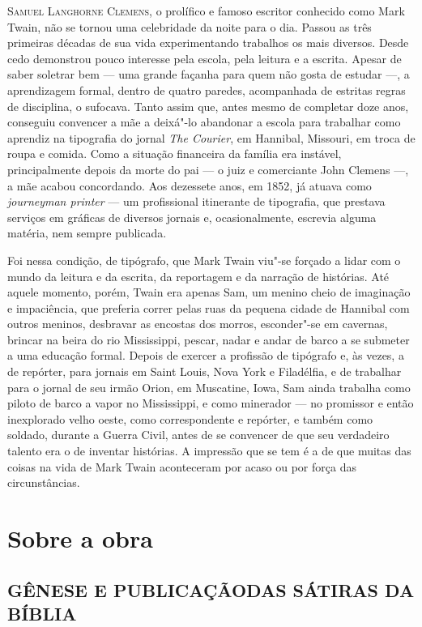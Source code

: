 \noindent\textsc{Samuel Langhorne Clemens,} o prolífico e famoso escritor conhecido como Mark
Twain, não se tornou uma celebridade da noite para o dia. Passou as três
primeiras décadas de sua vida experimentando trabalhos os mais diversos.
Desde cedo demonstrou pouco interesse pela escola,
pela leitura e a escrita. Apesar de saber soletrar bem --- uma grande
façanha para quem não gosta de estudar ---, a aprendizagem formal, dentro de
quatro paredes, acompanhada de estritas regras de disciplina, o sufocava. Tanto assim que, antes mesmo de
completar doze anos, conseguiu convencer a mãe a deixá"-lo abandonar 
a escola para trabalhar como aprendiz na tipografia do jornal \textit{The Courier},
em Hannibal, Missouri, em troca de roupa e comida. Como a situação
financeira da família era instável, principalmente depois da morte do pai
--- o juiz e comerciante John Clemens ---, a mãe acabou concordando. Aos dezessete
anos, em 1852, já atuava como \textit{journeyman printer} --- um
profissional itinerante de tipografia, que prestava serviços em gráficas
de diversos jornais e, ocasionalmente, escrevia alguma matéria, nem
sempre publicada.

Foi nessa condição, de tipógrafo, que Mark Twain
viu"-se forçado a lidar com o mundo da leitura e da escrita, da reportagem
e da narração de histórias. Até aquele momento, porém, Twain era
apenas Sam, um menino cheio de imaginação e impaciência, que preferia
correr pelas ruas da pequena cidade de Hannibal com outros meninos,
desbravar as encostas dos morros, esconder"-se em cavernas, brincar na
beira do rio Mississippi, pescar, nadar e andar de barco a se submeter a
uma educação formal. Depois de exercer a profissão de tipógrafo e, às
vezes, a de repórter, para jornais em Saint Louis, Nova York e
Filadélfia, e de trabalhar para o jornal de seu irmão Orion, em
Muscatine, Iowa, Sam ainda trabalha como piloto de barco a vapor no
Mississippi, e como minerador --- no promissor e então inexplorado velho oeste,
como correspondente e repórter, e também como soldado, durante a Guerra
Civil, antes de se convencer de que seu verdadeiro talento era o de inventar
histórias. A impressão que se tem é a de que muitas das coisas na vida de
Mark Twain aconteceram por acaso ou por força das circunstâncias.

\section{Sobre a obra}


\subsection{GÊNESE E PUBLICAÇÃO\break DAS SÁTIRAS DA BÍBLIA}

